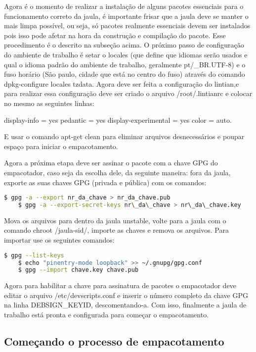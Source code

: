 Agora é o momento de realizar a instalação de alguns pacotes essenciais para o funcionamento correto da jaula, é importante frisar que a jaula deve se manter o mais limpa possível, ou seja, só pacotes realmente essenciais devem ser instalados pois isso pode afetar na hora da construção e compilação do pacote. Esse procedimento é o descrito na subseção acima. O próximo passo de configuração do ambiente de trabalho é setar o locales (que define que idiomas serão usados e qual o idioma padrão do ambiente de trabalho, geralmente pt/\_BR.UTF-8) e o fuso horário (São paulo, cidade que está no centro do fuso) através do comando dpkg-configure locales tzdata. Agora deve ser feita a configuração do lintian,e para realizar essa configuração deve ser criado o arquivo /root/.lintianrc e colocar no mesmo as seguintes linhas: 

display-info = yes 
pedantic = yes 
display-experimental = yes 
color = auto.

E usar o comando apt-get clean para eliminar arquivos desnecessários e poupar espaço para iniciar o empacotamento.

Agora a próxima etapa deve ser assinar o pacote com a chave GPG do empacotador, caso seja da escolha dele, da seguinte maneira: fora da jaula, exporte as suas chaves GPG (privada e pública) com os comandos:

\begin{lstlisting}[language=bash]
	$ gpg -a --export nr_da_chave > nr_da_chave.pub 
	$ gpg -a --export-secret-keys nr\_da\_chave > nr\_da\_chave.key
\end{lstlisting} 

Mova os arquivos para dentro da jaula unstable, volte para a jaula com o comando chroot /jaula-sid/, importe as chaves e remova os arquivos. Para importar use os seguintes comandos: 

\begin{lstlisting}[language=bash]
	$ gpg --list-keys 
	$ echo "pinentry-mode loopback" >> ~/.gnupg/gpg.conf 
	$ gpg --import chave.key chave.pub 
\end{lstlisting}

Agora para habilitar a chave para assinatura de pacotes o empacotador deve editar o arquivo /etc/devscripts.conf e inserir o número completo da chave GPG na linha DEBSIGN\_KEYID, descomentando-a. Com isso, finalmente a jaula de trabalho está pronta e configurada para começar o empacotamento.

\subsection{Começando o processo de empacotamento}

